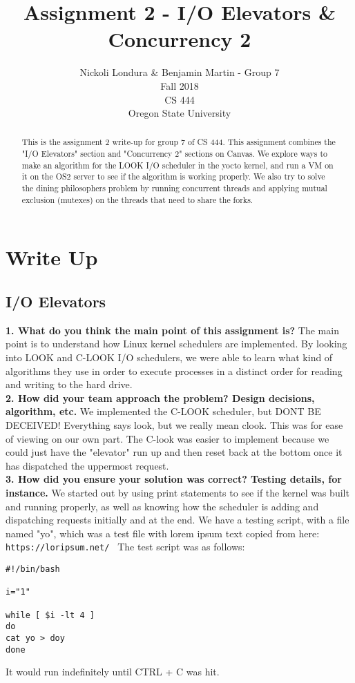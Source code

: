 \documentclass[10pt,a4paper,article]{article}
\title{Assignment 2 - I/O Elevators \& Concurrency 2}
\author{Nickoli Londura \& Benjamin Martin - Group 7 \\ Fall 2018 \\ CS 444 \\ Oregon State University}
\begin{document}
\maketitle

\begin{abstract}

\noindent This is the assignment 2 write-up for group 7 of CS 444. This assignment combines the "I/O Elevators" section and "Concurrency 2" sections on Canvas. We explore ways to make an algorithm for the LOOK I/O scheduler in the yocto kernel, and run a VM on it on the OS2 server to see if the algorithm is working properly. We also try to solve the dining philosophers problem by running concurrent threads and applying mutual exclusion (mutexes) on the threads that need to share the forks.

\end{abstract}

\newpage

\section{Write Up}
\subsection{I/O Elevators}

\textbf{1. What do you think the main point of this assignment is?}
The main point is to understand how Linux kernel schedulers are implemented. By looking into LOOK and C-LOOK I/O schedulers, we were able to learn what kind of algorithms they use in order to execute processes in a distinct order for reading and writing to the hard drive. \\


\noindent \textbf{2. How did your team approach the problem? Design decisions, algorithm, etc.}
We implemented the C-LOOK scheduler, but DONT BE DECEIVED! Everything says look, but we really mean clook. This was for ease of viewing on our own part. The C-look was easier to implement because we could just have the "elevator" run up and then reset back at the bottom once it has dispatched the uppermost request.   \\


\noindent \textbf{3. How did you ensure your solution was correct? Testing details, for instance.}
We started out by using print statements to see if the kernel was built and running properly, as well as knowing how the scheduler is adding and dispatching requests initially and at the end. We have a testing script, with a file named "yo", which was a test file with lorem ipsum text copied from here: \verb| https://loripsum.net/ | The test script was as follows: \begin{verbatim}
#!/bin/bash

i="1"

while [ $i -lt 4 ]
do
cat yo > doy
done
\end{verbatim}
It would run indefinitely until CTRL + C was hit.
\\
\end{document}

